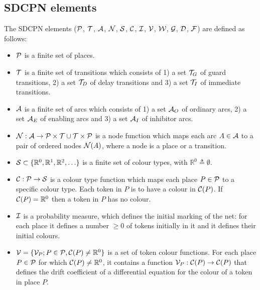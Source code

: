 \documentclass[copyright,creativecommons]{eptcs}
\begin{document}
\subsection{SDCPN elements}
The SDCPN elements (${\cal P}$, ${\cal T}$, ${\cal A}$,
${\cal N}$, ${\cal S}$, ${\cal C}$, ${\cal I}$, ${\cal V}$, ${\cal
W}$, ${\cal G}$, ${\cal D}$, ${\cal F}$) are defined as follows:
\begin{itemize}
\item ${\cal P}$ is a finite set of places.

\item ${\cal T}$ is a finite set of transitions which consists
      of 1) a set ${\cal
      T}_G$ of guard transitions, 2) a set ${\cal T}_D$ of delay
      transitions and 3) a set ${\cal T}_I$ of immediate transitions.

\item ${\cal A}$ is a finite set of arcs which consists
      of 1) a set ${\cal A}_O$ of ordinary arcs, 2) a set ${\cal A}_E$ of
      enabling arcs and 3) a set ${\cal A}_I$ of inhibitor arcs.

\item ${\cal N} : {\cal A} \to {\cal P}\times {\cal T} \cup {\cal T} \times
      {\cal P}$ is a node function which maps each arc $A \in {\cal A}$ to
      a pair of ordered nodes ${\cal N}(A)$, where a node is a place or a
      transition.

\item ${\cal S} \subset \{\mathbb{R}^0, \mathbb{R}^1, \mathbb{R}^2, \ldots \}$
      is a finite set of colour types, with $\mathbb{R}^0 \triangleq \emptyset$.

\item ${\cal C} : {\cal P} \to {\cal S}$ is a colour type function which maps
      each place $P \in {\cal P}$ to a specific colour type.
      Each token in $P$ is to have a colour in ${\cal C}(P)$. If ${\cal C}(P)
      = \mathbb{R}^0$ then a token in $P$ has no colour.

\item ${\cal I}$ is a probability measure,
      which defines the initial marking of the net:
      for each place it defines a number $\geq 0$ of tokens
      initially in it and it defines their initial colours.

\item ${\cal V} = \{{\cal V}_P ; P \in {\cal P}, {\cal C}(P) \neq
      \mathbb{R}^0\}$ is a set of token colour functions. For each place
      $P\in {\cal P}$ for which ${\cal C}(P)\neq \mathbb{R}^0$, it
      contains a function ${\cal V}_P : {\cal C}(P)
      \to {\cal C}(P)$ that defines the drift coefficient of a
      differential equation for the colour of a token in place $P$.


\end{itemize}
\end{document}
